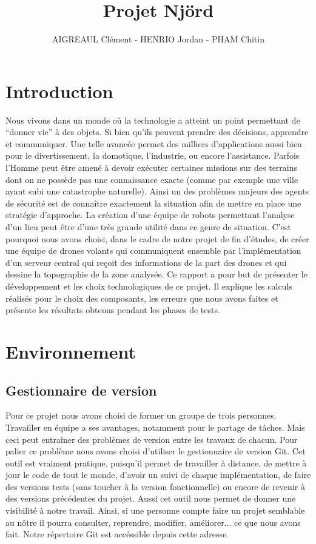 \documentclass[a4paper,10pt]{report}
\title{Projet Njörd}
\author{AIGREAUL Clément - HENRIO Jordan - PHAM Chitin}
\begin{document}
  \maketitle

  \chapter*{Introduction}
    Nous vivons dans un monde où la technologie a atteint un point permettant de “donner vie” à des objets. Si bien qu’ils
    peuvent prendre des décisions, apprendre et communiquer. Une telle avancée permet des milliers d’applications aussi bien
    pour le divertissement, la domotique, l’industrie, ou encore l’assistance. Parfois l’Homme peut être amené à devoir exécuter
    certaines missions sur des terrains dont on ne possède pas une connaissance exacte (comme par exemple une ville ayant subi
    une catastrophe naturelle). Ainsi un des problèmes majeurs des agents de sécurité est de connaître exactement la situation
    afin de mettre en place une stratégie d’approche. La création d’une équipe de robots permettant l’analyse d’un lieu peut être
    d’une très grande utilité dans ce genre de situation. C'est pourquoi nous avons choisi, dans le cadre de notre projet de fin 
    d'études, de créer une équipe de drones volants qui communiquent ensemble par l'implémentation d'un serveur central qui reçoit
    des informations de la part des drones et qui dessine la topographie de la zone analysée. Ce rapport a pour but de présenter 
    le développement et les choix technologiques de ce projet. Il explique les calculs réalisés pour le choix des composants, 
    les erreurs que nous avons faites et présente les résultats obtenus pendant les phases de tests.
  
  \tableofcontents

  \chapter{Environnement}
    \section{Gestionnaire de version}
      Pour ce projet nous avons choisi de former un groupe de trois personnes. Travailler en équipe a ses avantages, 
      notamment pour le partage de tâches. Mais ceci peut entraîner des problèmes de version entre les travaux de chacun. 
      Pour palier ce problème nous avons choisi d'utiliser le gestionnaire de version Git. Cet outil est vraiment pratique, 
      puisqu'il permet de travailler à distance, de mettre à jour le code de tout le monde, d'avoir un suivi de chaque implémentation, 
      de faire des versions tests (sans toucher à la version fonctionnelle) ou encore de revenir à des versions précédentes du projet.
      Aussi cet outil nous permet de donner une visibilité à notre travail. Ainsi, si une personne compte faire un projet semblable 
      au nôtre il pourra consulter, reprendre, modifier, améliorer... ce que nous avons fait. Notre répertoire Git est accéssible 
      depuis cette adresse\cite{njordgit}.
      
\end{document}
